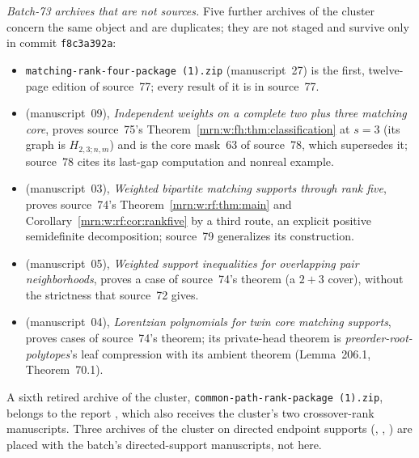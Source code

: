 \documentclass[11pt,a4paper]{article}
\theoremstyle{remark}\newtheorem{remark}[theorem]{Remark}
\newcommand{\prp}{\emph{preorder-root-polytopes}}
\begin{document}
\emph{Batch-73 archives that are not sources.} Five further archives of the
cluster concern the same object and are duplicates; they are not staged and
survive only in commit \texttt{f8c3a392a}:
\begin{itemize}
\item \texttt{matching-rank-four-package~(1).zip} (manuscript~27) is the first,
  twelve-page edition of source~77; every result of it is in source~77.
\item {} (manuscript~09), \emph{Independent
  weights on a complete two plus three matching core}, proves source~75's
  Theorem~\ref{mrn:w:fh:thm:classification} at $s=3$ (its graph is
  $H_{2,3;n,m}$) and is the core mask~63 of source~78, which supersedes it;
  source~78 cites its last-gap computation and nonreal example.
\item {} (manuscript~03),
  \emph{Weighted bipartite matching supports through rank five}, proves
  source~74's Theorem~\ref{mrn:w:rf:thm:main} and
  Corollary~\ref{mrn:w:rf:cor:rankfive} by a third route, an explicit positive
  semidefinite decomposition; source~79 generalizes its construction.
\item {} (manuscript~05), \emph{Weighted support
  inequalities for overlapping pair neighborhoods}, proves a case of source~74's
  theorem (a $2+3$ cover), without the strictness that source~72 gives.
\item {} (manuscript~04), \emph{Lorentzian
  polynomials for twin core matching supports}, proves cases of source~74's
  theorem; its private-head theorem is \prp's leaf compression with its ambient
  theorem (Lemma~206.1, Theorem~70.1).
\end{itemize}
A sixth retired archive of the cluster, \texttt{common-path-rank-package~(1).zip},
belongs to the report , which also receives
the cluster's two crossover-rank manuscripts. Three archives of the cluster on
directed endpoint supports (,
,
) are placed with the batch's
directed-support manuscripts, not here.
\end{document}
